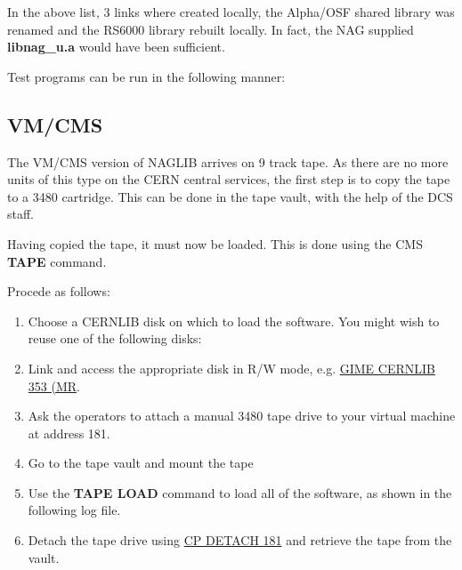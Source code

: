 In the above list, 3 links where created locally, the Alpha/OSF shared library was renamed
and the RS6000 library rebuilt locally. In fact, the NAG supplied {\bf libnag\_u.a} would
have been sufficient.

Test programs can be run in the following manner:


\subsection{VM/CMS}

The VM/CMS version of NAGLIB arrives on 9 track tape. As there are no
more units of this type on the CERN central services, the first step
is to copy the tape to a 3480 cartridge. This can be done in the tape
vault, with the help of the DCS staff.

Having copied the tape, it must now be loaded. This is done using
the CMS {\bf TAPE} command.

Procede as follows:

\begin{enumerate}
\item
Choose a CERNLIB disk on which to load the software. You might
wish to reuse one of the following disks:
\item
Link and access the appropriate disk in R/W mode, e.g. \underline{GIME CERNLIB 353 (MR}.
\item
Ask the operators to attach a manual 3480 tape drive to your virtual machine at address 181.
\item
Go to the tape vault and mount the tape
\item
Use the {\bf TAPE LOAD} command to load all of the software, as shown in the following log file.
\item
Detach the tape drive using \underline{CP DETACH 181} and retrieve the tape from the vault.
\end{enumerate}

